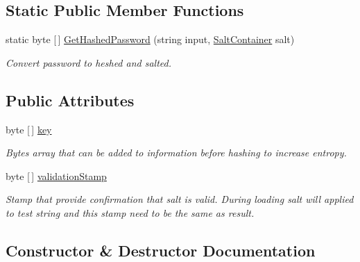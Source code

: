 \subsection*{Static Public Member Functions}
\begin{DoxyCompactItemize}
\item 
static byte \mbox{[}$\,$\mbox{]} \mbox{\hyperlink{class_authority_controller_1_1_data_1_1_application_1_1_salt_container_a35a53fe573ec37ee773a0f02af1cb496}{Get\+Hashed\+Password}} (string input, \mbox{\hyperlink{class_authority_controller_1_1_data_1_1_application_1_1_salt_container}{Salt\+Container}} salt)
\begin{DoxyCompactList}\small\item\em Convert password to heshed and salted. \end{DoxyCompactList}\end{DoxyCompactItemize}
\subsection*{Public Attributes}
\begin{DoxyCompactItemize}
\item 
byte \mbox{[}$\,$\mbox{]} \mbox{\hyperlink{class_authority_controller_1_1_data_1_1_application_1_1_salt_container_a0aaf05215aac85237a3fb02de5a55a44}{key}}
\begin{DoxyCompactList}\small\item\em Bytes array that can be added to information before hashing to increase entropy. \end{DoxyCompactList}\item 
byte \mbox{[}$\,$\mbox{]} \mbox{\hyperlink{class_authority_controller_1_1_data_1_1_application_1_1_salt_container_adcf2002c95427ded8b59046896b9c355}{validation\+Stamp}}
\begin{DoxyCompactList}\small\item\em Stamp that provide confirmation that salt is valid. During loading salt will applied to test string and this stamp need to be the same as result. \end{DoxyCompactList}\end{DoxyCompactItemize}


\subsection{Constructor \& Destructor Documentation}
\mbox{\label{class_authority_controller_1_1_data_1_1_application_1_1_salt_container_a0bbc5729faf6cdce0798360552359777}} 
